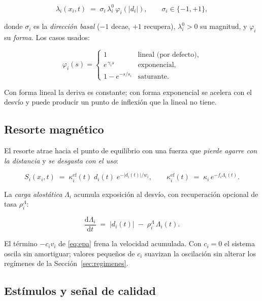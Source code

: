 \documentclass[11pt,a4paper]{article}
\newcommand{\dd}{\mathrm{d}}
\begin{document}
\begin{equation}
  \lambda_i(x_i,t) \;=\; \sigma_i \, \lambda_i^{0}\, \varphi_i\!\left(|d_i|\right),
  \qquad \sigma_i \in \{-1,+1\},
\end{equation}

donde $\sigma_i$ es la \emph{dirección basal} ($-1$ decae, $+1$ recupera), $\lambda_i^0>0$
su magnitud, y $\varphi_i$ su \emph{forma}. Los casos usados:

\begin{equation}
  \varphi_i(s) =
  \begin{cases}
    1 & \text{lineal (por defecto)},\\[2pt]
    e^{\,\gamma_i s} & \text{exponencial},\\[2pt]
    1 - e^{-s/s_i} & \text{saturante}.
  \end{cases}
\end{equation}

Con forma lineal la deriva es constante; con forma exponencial se acelera con el desvío
y puede producir un punto de inflexión que la lineal no tiene.

\subsection{Resorte magnético}

El resorte atrae hacia el punto de equilibrio con una fuerza que \emph{pierde agarre con
la distancia} y \emph{se desgasta con el uso}:

\begin{equation}
  S_i(x_i,t) \;=\; \kappa_i^{\mathrm{ef}}(t)\; d_i(t)\; e^{-|d_i(t)|/w_i},
  \qquad
  \kappa_i^{\mathrm{ef}}(t) \;=\; \kappa_i \, e^{-f_i \Lambda_i(t)} .
  \label{eq:spring}
\end{equation}

La \emph{carga alostática} $\Lambda_i$ acumula exposición al desvío, con recuperación
opcional de tasa $\rho_i^{\Lambda}$:

\begin{equation}
  \frac{\dd \Lambda_i}{\dd t} \;=\; |d_i(t)| \;-\; \rho_i^{\Lambda}\,\Lambda_i(t).
\end{equation}

El término $-c_i v_i$ de \eqref{eq:epa} frena la velocidad acumulada. Con $c_i=0$ el
sistema oscila sin amortiguar; valores pequeños de $c_i$ suavizan la oscilación sin
alterar los regímenes de la Sección~\ref{sec:regimenes}.

\subsection{Estímulos y señal de calidad}
\end{document}
